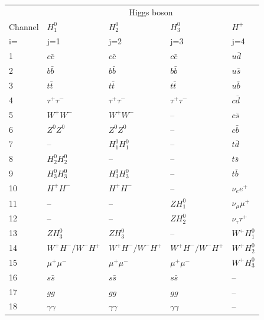 \documentclass[a4paper,10pt,oneside]{book}
\newcommand{\code}[1]{\ft{#1}}
\newcommand{\ft}[1]{\textsf{#1}}
\begin{document}
\begin{table}
\centering
\begin{tabular}{lllll} \hline
 & \multicolumn{4}{c}{Higgs boson} \\ \cline{2-5}
Channel & $H_1^0$ & $H_2^0$ & $H_3^0$ & $H^+$ \\
\code{i=} & \code{j=1} & \code{j=2} & \code{j=3} & \code{j=4} \\ \hline
1  & $c\bar{c}$          & $c\bar{c}$          & $c\bar{c}$          & $u \bar{d}$ \\
2  & $b \bar{b}$         & $b \bar{b}$         & $b \bar{b}$         & $u \bar{s}$ \\
3  & $t\bar{t}$          & $t\bar{t}$          & $t\bar{t}$          & $u \bar{b}$ \\
4  & $\tau^+ \tau^-$     & $\tau^+ \tau^-$     & $\tau^+ \tau^-$     & $c \bar{d}$ \\
5  & $W^+W^-$            & $W^+W^-$            & --                  & $c \bar{s}$ \\ \hline
6  & $Z^0 Z^0$           & $Z^0 Z^0$           & --                  & $c \bar{b}$ \\
7  & --                  & $H_1^0 H_1^0$       & --                  & $t \bar{d}$ \\
8  & $H_2^0 H_2^0$       & --                  & --                  & $t \bar{s}$ \\
9  & $H_3^0 H_3^0$       & $H_3^0 H_3^0$       & --                  & $t \bar{b}$ \\
10 & $H^+ H^-$           & $H^+ H^-$           & --                  & $\nu_e e^+$ \\ \hline
11 & --                  & --                  & $Z H_1^0$           & $\nu_\mu \mu^+$ \\       
12 & --                  & --                  & $Z H_2^0$           & $\nu_\tau\tau^+$\\
13 & $Z H_3^0$           & $Z H_3^0$           & --                  & $W^+ H_1^0$ \\
14 & $W^+ H^- / W^- H^+$ & $W^+ H^- / W^- H^+$ & $W^+ H^- / W^- H^+$ & $W^+ H_2^0$ \\
15 & $\mu^+ \mu^-$       & $\mu^+ \mu^-$       & $\mu^+ \mu^-$       & $W^+ H_3^0$ \\ \hline
16 & $s\bar{s}$          & $s\bar{s}$          & $s\bar{s}$          & --\\
17 & $gg$                & $gg$                & $gg$                & --\\
18 & $\gamma \gamma$     & $\gamma \gamma$     & $\gamma \gamma$     & --\\

\end{tabular}
\end{table}
\end{document}
